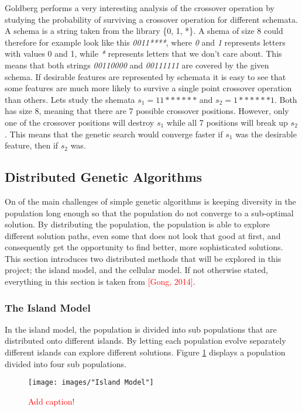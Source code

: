 \noindent Goldberg performs a very interesting analysis of the crossover operation by studying the probability of surviving a crossover operation for different schemata. A schema is a string taken from the library \{0, 1, *\}.  A shema of size 8 could therefore for example look like this \textit{0011****}, where \textit{0} and \textit{1} represents letters with values 0 and 1, while \textit{*} represents letters that we don't care about. This means that both strings \textit{00110000} and \textit{00111111} are covered by the given schema. If desirable features are represented by schemata it is easy to see that some features are much more likely to survive a single point crossover operation than others. Lets study the shemata $s_1 = 11******$ and $s_2  = 1******1$. Both has size 8, meaning that there are 7 possible crossover positions. However, only one of the crossover positions will destroy $s_1$ while all 7 positions will break up $s_2$. This means that the genetic search would converge faster if $s_1$ was the desirable feature, then if $s_2$ was.


\subsection{Distributed Genetic Algorithms}
On of the main challenges of simple genetic algorithms is keeping diversity in the population long enough so that the population do not converge to a sub-optimal solution. By distributing the population, the population is able to explore different solution paths, even some that does not look that good at first, and consequently get the opportunity to find better, more sophisticated solutions. This section introduces two distributed methods that will be explored in this project; the island model, and the cellular model. If not otherwise stated, everything in this section is taken from \textcolor{red}{[Gong, 2014]}.


\subsubsection{The Island Model}
In the island model, the population is divided into sub populations that are distributed onto different islands. By letting each population evolve separately different islands can explore different solutions. Figure \ref{Island model} displays a population divided into four sub populations. 


\begin{figure}[h!]
\begin{center}
\texttt{[image: images/"Island Model"]}
\caption{\textcolor{red}{Add caption!}}
\label{Island model}
\end{center}
\end{figure}



